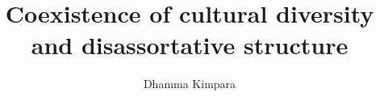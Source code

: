 \documentclass{article}
\theoremstyle{definition}
\begin{document}
\title{Coexistence of cultural diversity and disassortative structure}
 \author{Dhamma Kimpara}

\maketitle
















\newpage



\end{document}
